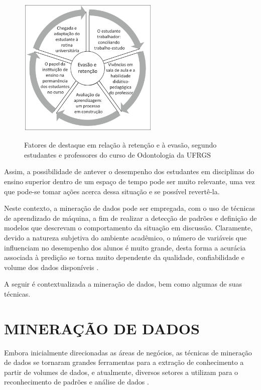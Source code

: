 \begin{figure}[!htb]
    \centering
    \caption{Fatores de destaque em relação à retenção e à evasão, segundo estudantes e professores do curso de Odontologia da UFRGS}
    \includegraphics[width=0.6\textwidth]{./dados/figuras/proposta/evasao-retencao}
    \label{fig:evasao-retencao}
\end{figure}

Assim, a possibilidade de antever o desempenho dos estudantes em disciplinas do ensino superior dentro de um espaço de tempo pode ser muito relevante, uma vez que pode-se tomar ações acerca dessa situação e se possível revertê-la.

Neste contexto, a mineração de dados pode ser empregada, com o uso de técnicas de aprendizado de máquina, a fim de realizar a detecção de padrões e definição de modelos que descrevam o comportamento da situação em discussão. Claramente, devido a natureza subjetiva do ambiente acadêmico, o número de variáveis que influenciam no desempenho dos alunos é muito grande, desta forma a acurácia associada à predição se torna muito dependente da qualidade, confiabilidade e volume dos dados disponíveis \cite{Caetano2016}.

A seguir é contextualizada a mineração de dados, bem como algumas de suas técnicas.

\section{MINERAÇÃO DE DADOS}
\label{sec:mineracaoDados}

Embora inicialmente direcionadas as áreas de negócios, as técnicas de mineração de dados se tornaram grandes ferramentas para a extração de conhecimento a partir de volumes de dados, e atualmente, diversos setores a utilizam para o reconhecimento de padrões e análise de dados \cite{Marques2015}.

